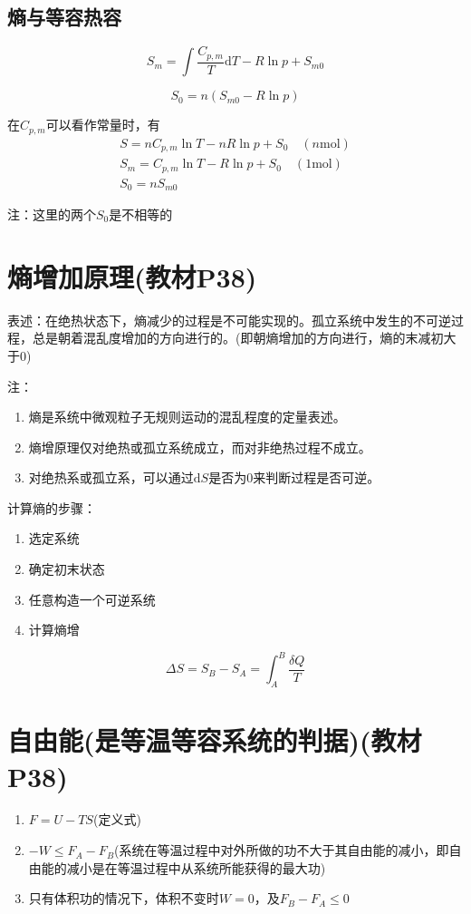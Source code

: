 \documentclass[oneside]{ctexbook}
\begin{document}
\subsection{熵与等容热容}
\[S_m=\int\dfrac{C_{p,m}}{T}\mathrm{d}T-R\ln{}p+S_{m0}\]

\begin{equation}
S_0=n(S_{m0}-R\ln{}p)%
\end{equation}

在\(C_{p,m}\)可以看作常量时，有
\begin{gather*}
    S=nC_{p,m}\ln{}T-nR\ln{}p+S_0\quad(n\mathrm{mol})\\
    S_m=C_{p,m}\ln{}T-R\ln{}p+S_0\quad(1\mathrm{mol})\\
    S_0=nS_{m0}
\end{gather*}

注：这里的两个\(S_0\)是不相等的

\section{熵增加原理(教材P38)}

表述：在绝热状态下，熵减少的过程是不可能实现的。孤立系统中发生的不可逆过程，总是朝着混乱度增加的方向进行的。(即朝熵增加的方向进行，熵的末减初大于0)

注：
\begin{enumerate}
    \item 熵是系统中微观粒子无规则运动的混乱程度的定量表述。
    \item 熵增原理仅对绝热或孤立系统成立，而对非绝热过程不成立。
    \item 对绝热系或孤立系，可以通过\(\mathrm{d}S\)是否为0来判断过程是否可逆。
\end{enumerate}

计算熵的步骤：
\begin{enumerate}
    \item 选定系统
    \item 确定初末状态
    \item 任意构造一个可逆系统
    \item 计算熵增
\end{enumerate}

\begin{equation}
\Delta{}S=S_B-S_A=\int_A^B\dfrac{\delta{}Q}{T}
\end{equation}

\section{自由能(是等温等容系统的判据)(教材P38)}
\begin{enumerate}
    \item \(F=U-TS\)(定义式)
    \item \(-W\leq{}F_A-F_B\)(系统在等温过程中对外所做的功不大于其自由能的减小，即自由能的减小是在等温过程中从系统所能获得的最大功)
    \item 只有体积功的情况下，体积不变时\(W=0\)，及\(F_B-F_A\leq{}0\)
\end{enumerate}
\end{document}
